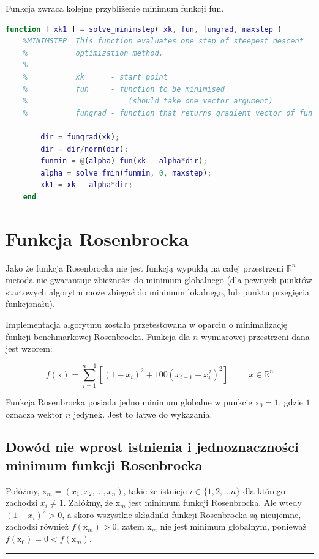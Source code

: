 \documentclass[12pt]{article}
\begin{document}
Funkcja zwraca kolejne przybliżenie minimum funkcji fun.

\begin{lstlisting}[language=MATLAB, style=mystyle]
    function [ xk1 ] = solve_minimstep( xk, fun, fungrad, maxstep )
    %MINIMSTEP  This function evaluates one step of steepest descent
    %           optimization method.
    %
    %           xk      - start point
    %           fun     - function to be minimised
    %                       (should take one vector argument)
    %           fungrad - function that returns gradient vector of fun
    
        dir = fungrad(xk);
        dir = dir/norm(dir);
        funmin = @(alpha) fun(xk - alpha*dir);
        alpha = solve_fmin(funmin, 0, maxstep);
        xk1 = xk - alpha*dir;
    end
\end{lstlisting}

\newpage

\section*{Funkcja Rosenbrocka}

Jako że funkcja Rosenbrocka nie jest funkcją wypukłą na całej przestrzeni
$\mathbb{R}^{n}$ metoda nie gwarantuje zbieżności do minimum globalnego (dla
pewnych punktów startowych algorytm może zbiegać do minimum lokalnego, lub
punktu przegięcia funkcjonału).

Implementacja algorytmu została przetestowana w oparciu o minimalizację funkcji
benchmarkowej Rosenbrocka. Funkcja dla $n$ wymiarowej przestrzeni dana jest
wzorem:

\begin{equation}
    f(\mathrm{x}) = \sum^{n-1}_{i=1} \left[(1-x_i)^2 + 100(x_{i+1} -
    x_i^2)^2\right] \hspace{1cm} x \in \mathbb{R}^n
\end{equation}

Funkcja Rosenbrocka posiada jedno minimum globalne w punkcie
$\mathrm{x}_0 = \textrm{1}$, gdzie $1$ oznacza wektor $n$ jedynek. Jest to
łatwe do wykazania.

\subsection*{Dowód nie wprost istnienia i jednoznaczności minimum funkcji
Rosenbrocka}

Połóżmy, $\mathrm{x}_m = (x_1, x_2, \ldots, x_n)$, takie że istnieje $i \in
\{1,2,\ldots n\}$ dla którego zachodzi $x_i \neq 1$. Załóżmy, że $\mathrm{x}_m$
jest minimum funkcji Rosenbrocka. Ale wtedy $(1-x_i)^2 > 0$, a skoro wszystkie
składniki funkcji Rosenbrocka są nieujemne, zachodzi również $f(\mathrm{x}_m) >
0$, zatem $\mathrm{x}_m$ nie jest minimum globalnym, ponieważ $f(\mathrm{x}_0)
= 0 < f(\mathrm{x}_m)$.\\ \rule{1ex}{1ex}
\end{document}
